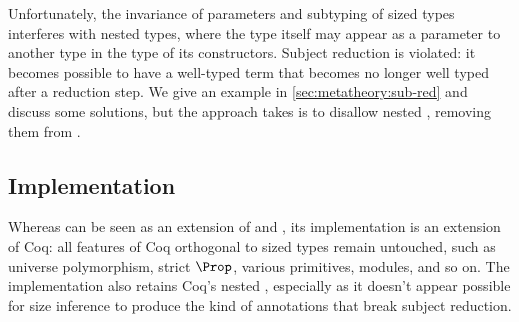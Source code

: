 Unfortunately, the invariance of parameters and subtyping of sized \coinductive types interferes with nested \coinductive types,
where the type itself may appear as a parameter to another type in the type of its constructors.
Subject reduction is violated: it becomes possible to have a well-typed term that becomes no longer well typed after a reduction step.
We give an example in \autoref{sec:metatheory:sub-red} and discuss some solutions,
but the approach \lang takes is to disallow nested \coinductives,
removing them from \CIChat.

\iffalse
\subsection{Position Size Annotations}

Although users aren't required to indicate the recursive argument when writing fixpoints in Coq,
they are indicated in the core calculus because Coq's type checker will attempt determine which one it is when not explicitly indicated.
This tells the guard predicate which argument should be checked for structural smallerness.
Similarly, \lang has position annotations to indicate which argument is the recursive argument and whether the \cofixpoint preserves sizes or not,
but they are entirely determined during size inference.
This augments the inference algorithm for \CIChat,
which assumes that the annotations are already present.

Note that while inference begins with terms whose position annotations are absent,
we do assume that the recursive arguments are already indicated,
separating what Coq already does from what there is to do to obtain sized types.
In terms of the implementation, one downside of this approach is that not as many programs that \emph{could} pass type checking \emph{do},
due to the existing architecture of the Coq type checker.
We discuss this further in \autoref{sec:impl:recind}.
\fi

\subsection{Implementation}

Whereas \lang can be seen as an extension of \CIChat and \CChatomega,
its implementation is an extension of Coq:
all features of Coq orthogonal to sized types remain untouched,
such as universe polymorphism, strict $\Prop$, various primitives, modules, and so on.
The implementation also retains Coq's nested \coinductives,
especially as it doesn't appear possible for size inference to produce the kind of annotations that break subject reduction.

